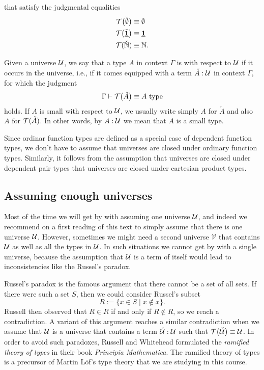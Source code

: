 \begin{defn}
\begin{enumerate}
    that satisfy the judgmental equalities
    \begin{align*}
      \mathcal{T}\big(\check{\emptyset}\big) & \equiv \emptyset \\
      \mathcal{T}\big(\check{\underline{\mathbf{1}}}\big) & \equiv \underline{\mathbf{1}} \\
      \mathcal{T}(\check{{\mathbb{N}}}) & \equiv {\mathbb{N}}.
    \end{align*}
  \end{enumerate}
  Given a universe $\mathcal{U}$, we say that a type $A$ in context $\Gamma$ is  with respect to $\mathcal{U}$ if it occurs in the universe, i.e., if it comes equipped with a term $\check{A}:\mathcal{U}$ in context $\Gamma$, for which the judgment
  \begin{equation*}
    \Gamma\vdash\mathcal{T}\big(\check{A}\big)\equiv A~\mathrm{type}
  \end{equation*}
  holds. If $A$ is small with respect to $\mathcal{U}$, we usually write simply $A$ for $\check{A}$ and also $A$ for $\mathcal{T}(\check{A})$. In other words, by $A:\mathcal{U}$ we mean that $A$ is a small type. 
\end{defn}

\begin{rmk}
  Since ordinar function types are defined as a special case of dependent function types, we don't have to assume that universes are closed under ordinary function types. Similarly, it follows from the assumption that universes are closed under dependent pair types that universes are closed under cartesian product types.
\end{rmk}

\subsection{Assuming enough universes}
  Most of the time we will get by with assuming one universe $\mathcal{U}$, and indeed we recommend on a first reading of this text to simply assume that there is one universe $\mathcal{U}$. However, sometimes we might need a second universe $\mathcal{V}$ that contains $\mathcal{U}$ as well as all the types in $\mathcal{U}$. In such situations we cannot get by with a single universe, because the assumption that $\mathcal{U}$ is a term of itself would lead to inconsistencies like the Russel's paradox.

  Russel's paradox is the famous argument that there cannot be a set of all sets. If there were such a set $S$, then we could consider Russel's subset
  \begin{equation*}
    R:=\{x\in S\mid x\notin x\}.
  \end{equation*}
  Russell then observed that $R\in R$ if and only if $R\notin R$, so we reach a contradiction. A variant of this argument reaches a similar contradiction when we assume that $\mathcal{U}$ is a universe that contains a term $\check{\mathcal{U}}:\mathcal{U}$ such that $\mathcal{T}\big(\check{\mathcal{U}}\big)\equiv \mathcal{U}$. In order to avoid such paradoxes, Russell and Whitehead formulated the \emph{ramified theory of types} in their book \emph{Principia Mathematica}. The ramified theory of types is a precursor of Martin L\"of's type theory that we are studying in this course.  

